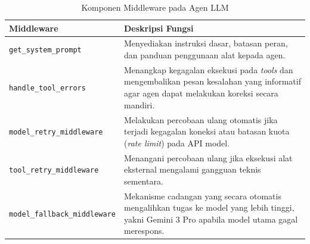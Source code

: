 \begin{table}[H]
    \centering
    \caption{Komponen Middleware pada Agen LLM}
    \label{tab:middleware_components}
    \small
    \begin{tabular}{|l|p{7cm}|}
    \hline
    Middleware & Deskripsi Fungsi \\ \hline
    \texttt{get\_system\_prompt} & Menyediakan instruksi dasar, batasan peran, dan panduan penggunaan alat kepada agen. \\ \hline
    \texttt{handle\_tool\_errors} & Menangkap kegagalan eksekusi pada \textit{tools} dan mengembalikan pesan kesalahan yang informatif agar agen dapat melakukan koreksi secara mandiri. \\ \hline
    \texttt{model\_retry\_middleware} & Melakukan percobaan ulang otomatis jika terjadi kegagalan koneksi atau batasan kuota (\textit{rate limit}) pada API model. \\ \hline
    \texttt{tool\_retry\_middleware} & Menangani percobaan ulang jika eksekusi alat eksternal mengalami gangguan teknis sementara. \\ \hline
    \texttt{model\_fallback\_middleware} & Mekanisme cadangan yang secara otomatis mengalihkan tugas ke model yang lebih tinggi, yakni Gemini 3 Pro apabila model utama gagal merespons. \\ \hline
    \end{tabular}
\end{table}

